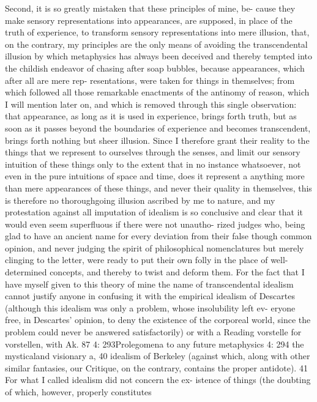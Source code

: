 Second, it is so greatly mistaken that these principles of mine, be-
cause they make sensory representations into appearances, are supposed,
in place of the truth of experience, to transform sensory representations
into mere illusion, that, on the contrary, my principles are the only means
of avoiding the transcendental illusion by which metaphysics has always
been deceived and thereby tempted into the childish endeavor of chasing
after soap bubbles, because appearances, which after all are mere rep-
resentations, were taken for things in themselves; from which followed
all those remarkable enactments of the antinomy of reason, which I will
mention later on, and which is removed through this single observation:
that appearance, as long as it is used in experience, brings forth truth, but
as soon as it passes beyond the boundaries of experience and becomes
transcendent, brings forth nothing but sheer illusion.
Since I therefore grant their reality to the things that we represent
to ourselves through the senses, and limit our sensory intuition of these
things only to the extent that in no instance whatsoever, not even in the
pure intuitions of space and time, does it represent a anything more than
mere appearances of these things, and never their quality in themselves,
this is therefore no thoroughgoing illusion ascribed by me to nature,
and my protestation against all imputation of idealism is so conclusive
and clear that it would even seem superﬂuous if there were not unautho-
rized judges who, being glad to have an ancient name for every deviation
from their false though common opinion, and never judging the spirit
of philosophical nomenclatures but merely clinging to the letter, were
ready to put their own folly in the place of well-determined concepts,
and thereby to twist and deform them. For the fact that I have myself
given to this theory of mine the name of transcendental idealism cannot
justify anyone in confusing it with the empirical idealism of Descartes
(although this idealism was only a problem, whose insolubility left ev-
eryone free, in Descartes’ opinion, to deny the existence of the corporeal
world, since the problem could never be answered satisfactorily) or with
a
Reading vorstelle for vorstellen, with Ak.
87
4: 293Prolegomena to any future metaphysics
4: 294
the mysticaland visionary a, 40 idealism of Berkeley (against which, along
with other similar fantasies, our Critique, on the contrary, contains the
proper antidote). 41 For what I called idealism did not concern the ex-
istence of things (the doubting of which, however, properly constitutes
